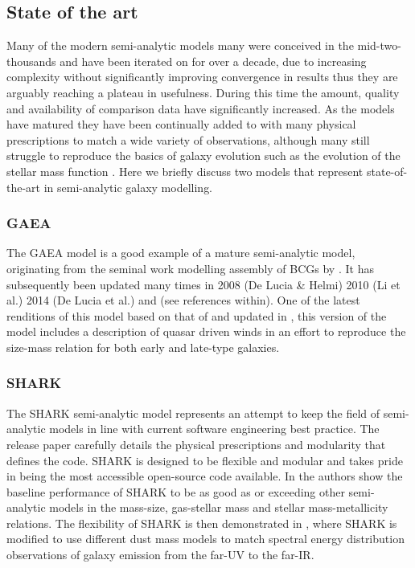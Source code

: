 \subsection{State of the art}
Many of the modern semi-analytic models many were conceived in the mid-two-thousands and have been iterated on for over a decade, due to increasing complexity without significantly improving convergence in results thus they are arguably reaching a plateau in usefulness. During this time the amount, quality and availability of comparison data have significantly increased. As the models have matured they have been continually added to with many physical prescriptions to match a wide variety of observations, although many still struggle to reproduce the basics of galaxy evolution such as the evolution of the stellar mass function \cite{Asquith2018CosmicModels}. Here we briefly discuss two models that represent state-of-the-art in semi-analytic galaxy modelling.

\subsubsection{GAEA}
The GAEA model is a good example of a mature semi-analytic model, originating from the seminal work modelling assembly of BCGs by \citet{DeLucia2007TheGalaxies}. It has subsequently been updated many times in 2008 (De Lucia \& Helmi) 2010 (Li et al.) 2014 (De Lucia et al.) and \citet{Hirschmann2016GalaxyModel} (see references within).
One of the latest renditions of this model based on that of \citep{Xie2017H2-basedFormation} and updated in \citep{Zoldan2019TheEvolution}, this version of the model includes a description of quasar driven winds in an effort to reproduce the size-mass relation for both early and late-type galaxies.

\subsubsection{SHARK}
The SHARK semi-analytic model represents an attempt to keep the field of semi-analytic models in line with current software engineering best practice. The release paper \citep{Lagos2018Shark:Formation} carefully details the physical prescriptions and modularity that defines the code. SHARK is designed to be flexible and modular and takes pride in being the most accessible open-source code available. In \citet{Lagos2018Shark:Formation} the authors show the baseline performance of SHARK to be as good as or exceeding other semi-analytic models in the mass-size, gas-stellar mass and stellar mass-metallicity relations. The flexibility of SHARK is then demonstrated in \citet{Lagos2019FromModel}, where  SHARK is modified to use different dust mass models to match spectral energy distribution observations of galaxy emission from the far-UV to the far-IR.

